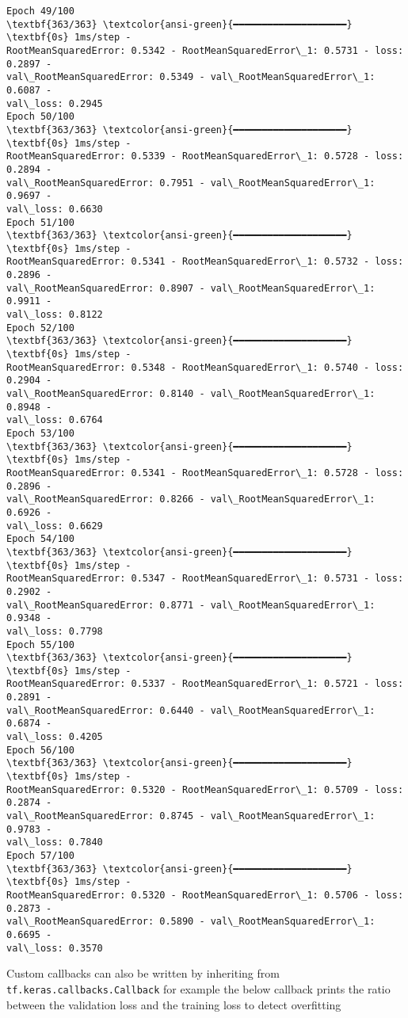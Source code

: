 \documentclass[12pt letter]{report}
\begin{document}
\begin{Verbatim}[commandchars=\\\{\}]
Epoch 49/100
\textbf{363/363} \textcolor{ansi-green}{━━━━━━━━━━━━━━━━━━━━} \textbf{0s} 1ms/step -
RootMeanSquaredError: 0.5342 - RootMeanSquaredError\_1: 0.5731 - loss: 0.2897 -
val\_RootMeanSquaredError: 0.5349 - val\_RootMeanSquaredError\_1: 0.6087 -
val\_loss: 0.2945
Epoch 50/100
\textbf{363/363} \textcolor{ansi-green}{━━━━━━━━━━━━━━━━━━━━} \textbf{0s} 1ms/step -
RootMeanSquaredError: 0.5339 - RootMeanSquaredError\_1: 0.5728 - loss: 0.2894 -
val\_RootMeanSquaredError: 0.7951 - val\_RootMeanSquaredError\_1: 0.9697 -
val\_loss: 0.6630
Epoch 51/100
\textbf{363/363} \textcolor{ansi-green}{━━━━━━━━━━━━━━━━━━━━} \textbf{0s} 1ms/step -
RootMeanSquaredError: 0.5341 - RootMeanSquaredError\_1: 0.5732 - loss: 0.2896 -
val\_RootMeanSquaredError: 0.8907 - val\_RootMeanSquaredError\_1: 0.9911 -
val\_loss: 0.8122
Epoch 52/100
\textbf{363/363} \textcolor{ansi-green}{━━━━━━━━━━━━━━━━━━━━} \textbf{0s} 1ms/step -
RootMeanSquaredError: 0.5348 - RootMeanSquaredError\_1: 0.5740 - loss: 0.2904 -
val\_RootMeanSquaredError: 0.8140 - val\_RootMeanSquaredError\_1: 0.8948 -
val\_loss: 0.6764
Epoch 53/100
\textbf{363/363} \textcolor{ansi-green}{━━━━━━━━━━━━━━━━━━━━} \textbf{0s} 1ms/step -
RootMeanSquaredError: 0.5341 - RootMeanSquaredError\_1: 0.5728 - loss: 0.2896 -
val\_RootMeanSquaredError: 0.8266 - val\_RootMeanSquaredError\_1: 0.6926 -
val\_loss: 0.6629
Epoch 54/100
\textbf{363/363} \textcolor{ansi-green}{━━━━━━━━━━━━━━━━━━━━} \textbf{0s} 1ms/step -
RootMeanSquaredError: 0.5347 - RootMeanSquaredError\_1: 0.5731 - loss: 0.2902 -
val\_RootMeanSquaredError: 0.8771 - val\_RootMeanSquaredError\_1: 0.9348 -
val\_loss: 0.7798
Epoch 55/100
\textbf{363/363} \textcolor{ansi-green}{━━━━━━━━━━━━━━━━━━━━} \textbf{0s} 1ms/step -
RootMeanSquaredError: 0.5337 - RootMeanSquaredError\_1: 0.5721 - loss: 0.2891 -
val\_RootMeanSquaredError: 0.6440 - val\_RootMeanSquaredError\_1: 0.6874 -
val\_loss: 0.4205
Epoch 56/100
\textbf{363/363} \textcolor{ansi-green}{━━━━━━━━━━━━━━━━━━━━} \textbf{0s} 1ms/step -
RootMeanSquaredError: 0.5320 - RootMeanSquaredError\_1: 0.5709 - loss: 0.2874 -
val\_RootMeanSquaredError: 0.8745 - val\_RootMeanSquaredError\_1: 0.9783 -
val\_loss: 0.7840
Epoch 57/100
\textbf{363/363} \textcolor{ansi-green}{━━━━━━━━━━━━━━━━━━━━} \textbf{0s} 1ms/step -
RootMeanSquaredError: 0.5320 - RootMeanSquaredError\_1: 0.5706 - loss: 0.2873 -
val\_RootMeanSquaredError: 0.5890 - val\_RootMeanSquaredError\_1: 0.6695 -
val\_loss: 0.3570
    \end{Verbatim}

Custom callbacks can also be written by inheriting from
\texttt{tf.keras.callbacks.Callback} for example the below callback
prints the ratio between the validation loss and the training loss to
detect overfitting
\end{document}
